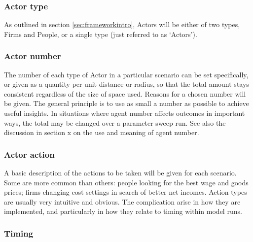 \subsubsection{Actor type}

As outlined in section \ref{sec:frameworkintro}, Actors will be either of two types, Firms and People, or a single type (just referred to as `Actors'). 

\subsubsection{Actor number}

The number of each type of Actor in a particular scenario can be set specifically, or given as a quantity per unit distance or radius, so that the total amount stays consistent regardless of the size of space used. Reasons for a chosen number will be given. The general principle is to use as small a number as possible to achieve useful insights. In situations where agent number affects outcomes in important ways, the total may be changed over a parameter sweep run. See also the discussion in section x on the use and meaning of agent number.


\subsubsection{Actor action}

A basic description of the actions to be taken will be given for each scenario. Some are more common than others: people looking for the best wage and goods prices; firms changing cost settings in search of better net incomes. Action types are usually very intuitive and obvious. The complication arise in how they are implemented, and particularly in how they relate to timing within model runs. 

\subsubsection{Timing}


